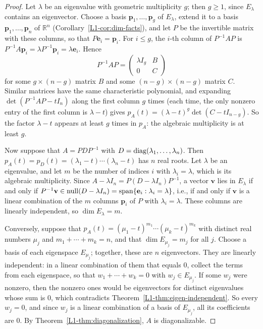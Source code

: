 \begin{proof}
    Let $\lambda$ be an eigenvalue with geometric multiplicity $g$; then $g \geq 1$, since $E_\lambda$ contains an eigenvector. Choose a basis $\mathbf{p}_1, \ldots, \mathbf{p}_g$ of $E_\lambda$, extend it to a basis $\mathbf{p}_1, \ldots, \mathbf{p}_n$ of $\mathbb{R}^n$ (Corollary~\ref{L1-cor:dim-facts}), and let $P$ be the invertible matrix with these columns, so that $P\mathbf{e}_i = \mathbf{p}_i$. For $i \leq g$, the $i$-th column of $P^{-1}AP$ is $P^{-1}A\mathbf{p}_i = \lambda P^{-1}\mathbf{p}_i = \lambda \mathbf{e}_i$. Hence
    \[P^{-1}AP = \begin{pmatrix} \lambda I_g & B \\ 0 & C \end{pmatrix}\]
    for some $g \times (n - g)$ matrix $B$ and some $(n - g) \times (n - g)$ matrix $C$. Similar matrices have the same characteristic polynomial, and expanding $\det(P^{-1}AP - tI_n)$ along the first column $g$ times (each time, the only nonzero entry of the first column is $\lambda - t$) gives $p_A(t) = (\lambda - t)^g \det(C - tI_{n-g})$. So the factor $\lambda - t$ appears at least $g$ times in $p_A$: the algebraic multiplicity is at least $g$.

    Now suppose that $A = PDP^{-1}$ with $D = \operatorname{diag}(\lambda_1, \ldots, \lambda_n)$. Then $p_A(t) = p_D(t) = (\lambda_1 - t) \cdots (\lambda_n - t)$ has $n$ real roots. Let $\lambda$ be an eigenvalue, and let $m$ be the number of indices $i$ with $\lambda_i = \lambda$, which is its algebraic multiplicity. Since $A - \lambda I_n = P(D - \lambda I_n)P^{-1}$, a vector $\mathbf{v}$ lies in $E_\lambda$ if and only if $P^{-1}\mathbf{v} \in \operatorname{null}(D - \lambda I_n) = \operatorname{span}\{\mathbf{e}_i : \lambda_i = \lambda\}$, i.e., if and only if $\mathbf{v}$ is a linear combination of the $m$ columns $\mathbf{p}_i$ of $P$ with $\lambda_i = \lambda$. These columns are linearly independent, so $\dim E_\lambda = m$.

    Conversely, suppose that $p_A(t) = (\mu_1 - t)^{m_1} \cdots (\mu_k - t)^{m_k}$ with distinct real numbers $\mu_j$ and $m_1 + \cdots + m_k = n$, and that $\dim E_{\mu_j} = m_j$ for all $j$. Choose a basis of each eigenspace $E_{\mu_j}$; together, these are $n$ eigenvectors. They are linearly independent: in a linear combination of them that equals $0$, collect the terms from each eigenspace, so that $w_1 + \cdots + w_k = 0$ with $w_j \in E_{\mu_j}$. If some $w_j$ were nonzero, then the nonzero ones would be eigenvectors for distinct eigenvalues whose sum is $0$, which contradicts Theorem~\ref{L1-thm:eigen-independent}. So every $w_j = 0$, and since $w_j$ is a linear combination of a basis of $E_{\mu_j}$, all its coefficients are $0$. By Theorem~\ref{L1-thm:diagonalization}, $A$ is diagonalizable.
\end{proof}

